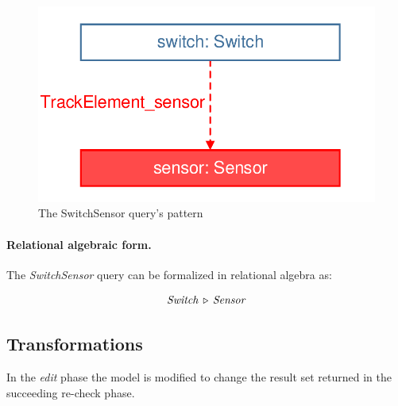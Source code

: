 \begin{figure}[Htb]
		\centering
		\includegraphics[scale=0.4]{figures/trainbenchmark-switchsensor}
		\caption{The SwitchSensor query's pattern}
		\label{fig:trainbenchmark-switchsensor}
\end{figure}

\paragraph{Relational algebraic form.} The \textit{SwitchSensor} query can be formalized in relational algebra as:

$$ \mathit{Switch} \, \triangleright \, \mathit{Sensor} $$


\subsection{Transformations}
\label{sec:transformatios}

In the \emph{edit} phase the model is modified to change the result set returned in the succeeding re-check phase.



